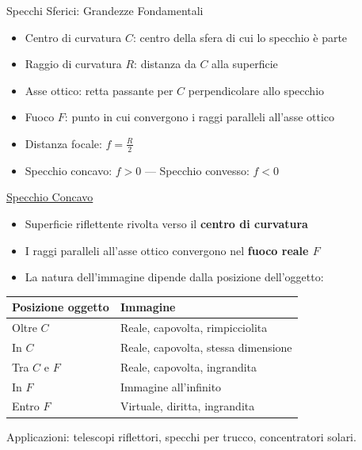 
\begin{frame}{Specchi Sferici: Grandezze Fondamentali}
    \begin{itemize}
        \item Centro di curvatura $C$: centro della sfera di cui lo specchio è parte
        \item Raggio di curvatura $R$: distanza da $C$ alla superficie
        \item Asse ottico: retta passante per $C$ perpendicolare allo specchio
        \item Fuoco $F$: punto in cui convergono i raggi paralleli all'asse ottico
        \item Distanza focale: $f = \frac{R}{2}$
        \item Specchio concavo: $f > 0$ — Specchio convesso: $f < 0$
    \end{itemize}
\end{frame}


\begin{frame}{\href{https://bhuiyanek.github.io/Fisica/riflessione.html?mode=concavo}{Specchio Concavo}}

    \begin{itemize}
        \item Superficie riflettente rivolta verso il \textbf{centro di curvatura}
        \item I raggi paralleli all’asse ottico convergono nel \textbf{fuoco reale $F$}
        \item La natura dell’immagine dipende dalla posizione dell’oggetto:
    \end{itemize}
    
    \medskip
    \centering
    
    \renewcommand{\arraystretch}{1.3}
    
    \begin{tabular}{|l|l|}
    \hline
    \rowcolor{maincolor!20}
    \textbf{Posizione oggetto} & \textbf{Immagine} \\
    \hline
    Oltre $C$ & Reale, capovolta, rimpicciolita \\
    \hline
    In $C$ & Reale, capovolta, stessa dimensione \\
    \hline
    Tra $C$ e $F$ & Reale, capovolta, ingrandita \\
    \hline
    In $F$ & Immagine all'infinito \\
    \hline
    Entro $F$ & Virtuale, diritta, ingrandita \\
    \hline
    \end{tabular}
    
    \medskip
    
    Applicazioni: telescopi riflettori, specchi per trucco, concentratori solari.

\end{frame}

